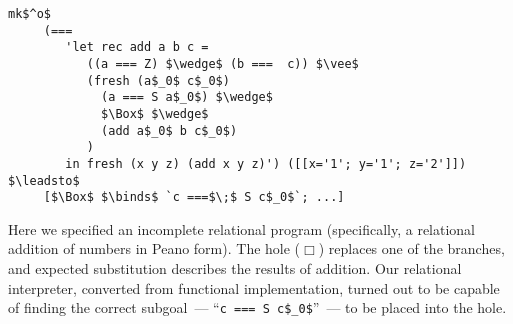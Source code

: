 \begin{lstlisting}[basicstyle=\small]
   mk$^o$
     (=== 
        'let rec add a b c =
           ((a === Z) $\wedge$ (b ===  c)) $\vee$
           (fresh (a$_0$ c$_0$)
             (a === S a$_0$) $\wedge$
             $\Box$ $\wedge$
             (add a$_0$ b c$_0$)
           )
        in fresh (x y z) (add x y z)') ([[x='1'; y='1'; z='2']])  $\leadsto$   
     [$\Box$ $\binds$ `c ===$\;$ S c$_0$`; ...]
\end{lstlisting}

Here we specified an incomplete relational program (specifically, a relational addition of numbers in Peano form). The hole ($\Box$) replaces
one of the branches, and expected substitution describes the results of addition. Our relational interpreter, converted from functional
implementation, turned out to be capable of finding the correct subgoal~--- ``\lstinline|c === S c$_0$|''~--- to be placed into the hole.


